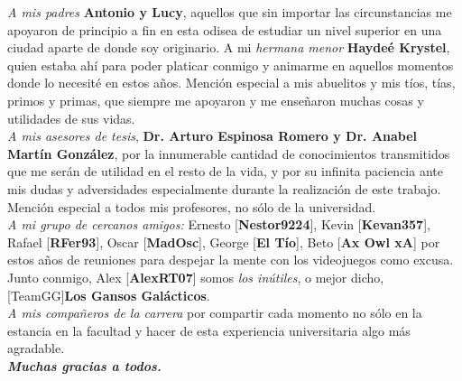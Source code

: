 \documentclass[
11pt, %
spanish, %
singlespacing, %
headsepline, %
]{MastersDoctoralThesis} %
\begin{document}
\begin{acknowledgements}
\addchaptertocentry{\acknowledgementname} %
\textit{A mis padres} \textbf{Antonio y Lucy}, aquellos que sin importar las circunstancias me apoyaron de principio a fin en esta odisea de estudiar un nivel superior en una ciudad aparte de donde soy originario. A mi \textit{hermana menor} \textbf{Haydeé Krystel}, quien estaba ahí para poder platicar conmigo y animarme en aquellos momentos donde lo necesité en estos años. Mención especial a mis abuelitos y mis tíos, tías, primos y primas, que siempre me apoyaron y me enseñaron muchas cosas y utilidades de sus vidas. \\

\textit{A mis asesores de tesis}, \textbf{Dr. Arturo Espinosa Romero y Dr. Anabel Martín González}, por la innumerable cantidad de conocimientos transmitidos que me serán de utilidad en el resto de la vida, y por su infinita paciencia ante mis dudas y adversidades especialmente durante la realización de este trabajo. Mención especial a todos mis profesores, no sólo de la universidad. \\

\textit{A mi grupo de cercanos amigos:} Ernesto [\textbf{Nestor9224}], Kevin [\textbf{Kevan357}], Rafael [\textbf{RFer93}], Oscar [\textbf{MadOsc}], George [\textbf{El Tío}], Beto [\textbf{Ax Owl xA}] por estos años de reuniones para despejar la mente con los videojuegos como excusa. Junto conmigo, Alex [\textbf{AlexRT07}] somos \textit{los inútiles}, o mejor dicho, [TeamGG]\textbf{Los Gansos Galácticos}. \\

\textit{A mis compañeros de la carrera} por compartir cada momento no sólo en la estancia en la facultad y hacer de esta experiencia universitaria algo más agradable. \\

\textbf{\textit{\Large Muchas gracias a todos.}}

\end{acknowledgements} 

\tableofcontents %

\listoffigures %

\listoftables %
\end{document}
